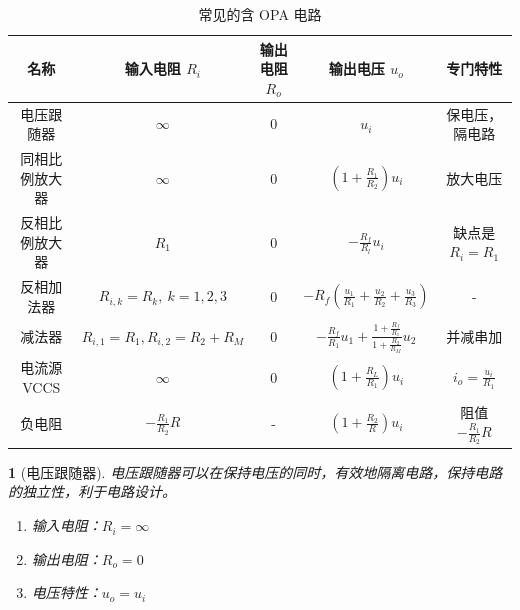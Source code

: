 \documentclass[UTF8]{report}
\theoremstyle{MyLineTheoremStyle} %
\theoremstyle{MyBlockTheoremStyle} %
\theoremstyle{MySubsubsectionStyle} %
\newtheorem{definition}{}
\begin{document}
\begin{table}[H]
    \centering
    \caption{常见的含 OPA 电路}
    \begin{tabular}{ccccc} 
    \toprule
    名称         & 输入电阻 $R_i$ & 输出电阻 $R_o$ & 输出电压 $u_o$ & 专门特性  \\
    \hline
    电压跟随器      &   $\infty$   &    0  &   $u_i$   &   保电压，隔电路    \\
    同相比例放大器    &   $\infty$    &  0    &   $(1+\frac{R_1}{R_2})u_i$   &   放大电压    \\
    反相比例放大器    &    $R_1$  &   0   &  $-\frac{R_f}{R_l}u_i$    &  缺点是 $R_i = R_1$     \\
    反相加法器      &   $R_{i,k} = R_k,\ k = 1,2,3$   &   0   &   $-R_f\left( \frac{u_1}{R_1} + \frac{u_2}{R_2} + \frac{u_3}{R_3} \right)$   &    -   \\
    减法器        &   {\small $R_{i,1} = R_1, R_{i,2} = R_2 + R_M$}   &   0   &   $-\frac{R_f}{R_1}u_1 + \frac{1+\frac{R_f}{R_1}}{ 1 + \frac{R_2}{R_M}}u_2$   &  并减串加      \\
    电流源 VCCS &   $\infty$    &    0  &   $\left(  1+\frac{R_L}{R_1} \right)u_i$   &   $i_o = \frac{u_i}{R_1}$    \\
    负电阻        &   $-\frac{R_1}{R_2}R$   &   -   &   $\left(  1+\frac{R_2}{R} \right)u_i$   &    阻值  $-\frac{R_1}{R_2}R$  \\
    \bottomrule
    \end{tabular}
\end{table}

\begin{definition}[电压跟随器]
电压跟随器可以在保持电压的同时，有效地隔离电路，保持电路的独立性，利于电路设计。
\begin{enumerate}
\item 输入电阻：$R_i = \infty$
\item 输出电阻：$R_o = 0$
\item 电压特性：$u_o = u_i$
\end{enumerate}
\end{definition}
\end{document}
